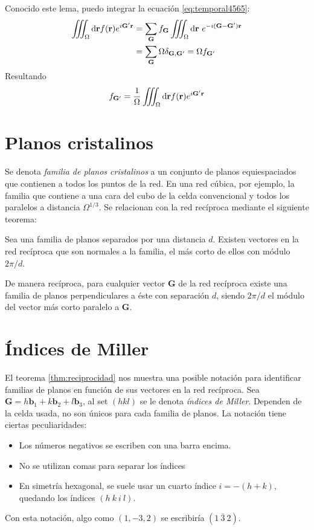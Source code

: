 Conocido este lema, puedo integrar la ecuación \ref{eq:temporal4565}:
\begin{equation}
\begin{split}
  \myiiint_\Omega \text{d}\mathbf{r} f (\mathbf{r})e ^{i\mathbf{G'}\mathbf{r}} &= \sum_\mathbf{G} f_\mathbf{G} \myiiint_\Omega \text{d}\mathbf{r} \ e ^{-i(\mathbf{G}-\mathbf{G'})\mathbf{r}} \\
  &= \sum_\mathbf{G} \Omega \delta_{\mathbf{G},\mathbf{G'}} = \Omega f_\mathbf{G'}
\end{split}
\end{equation}
Resultando
\begin{equation}
  f_\mathbf{G'} = \frac{1}{\Omega} \myiiint _\Omega \text{d}\mathbf{r} f (\mathbf{r})e ^{i\mathbf{G'}\mathbf{r}}
\end{equation}

\section{Planos cristalinos}
Se denota \emph{familia de planos cristalinos} a un conjunto de planos
equiespaciados que contienen a todos los puntos de la red. En una red
cúbica, por ejemplo, la familia que contiene a una cara del cubo de la
celda convencional y todos los paralelos a distancia
$\Omega^{1/3}$. Se relacionan con la red recíproca mediante el siguiente teorema:
\begin{theorem}
\label{thm:reciprocidad}
  Sea una familia de planos separados por una distancia $d$. Existen
  vectores en la red recíproca que son normales a la familia, el más
  corto de ellos con módulo $2\pi /d$.

  De manera recíproca, para cualquier vector $\mathbf{G}$ de la red
  recíproca existe una familia de planos perpendiculares a éste con
  separación $d$, siendo $2\pi /d$ el módulo del vector más corto
  paralelo a $\mathbf{G}$.
\end{theorem}

\section{Índices de Miller}
El teorema \ref{thm:reciprocidad} nos muestra una posible notación
para identificar familias de planos en función de sus vectores en la
red recíproca. Sea
$\mathbf{G} = h \mathbf{b}_1 + k \mathbf{b}_2 + l\mathbf{b}_3$, al set
$(h k l)$ se le denota \emph{índices de Miller}.  Dependen de la celda
usada, no son únicos para cada familia de planos. La notación tiene
ciertas peculiaridades:
\begin{itemize}
\item Los números negativos se escriben con una barra encima.
\item No se utilizan comas para separar los índices
\item En simetría hexagonal, se suele usar un cuarto índice
  $i=-(h+k)$, quedando los índices $(h \ k\  i\  l)$.
\end{itemize}
Con esta notación, algo como $(1,-3,2)$ se escribiría $(1 \ \bar 3 \ 2)$.

